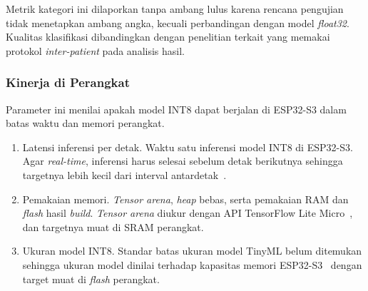 Metrik kategori ini dilaporkan tanpa ambang lulus karena rencana pengujian tidak menetapkan ambang angka, kecuali perbandingan dengan model \textit{float32}. Kualitas klasifikasi dibandingkan dengan penelitian terkait yang memakai protokol \textit{inter-patient} pada analisis hasil.

\subsubsection{Kinerja di Perangkat}

Parameter ini menilai apakah model INT8 dapat berjalan di ESP32-S3 dalam batas waktu dan memori perangkat.
\begin{enumerate}[label=\arabic*)]
  \item Latensi inferensi per detak. Waktu satu inferensi model INT8 di ESP32-S3. Agar \textit{real-time}, inferensi harus selesai sebelum detak berikutnya sehingga targetnya lebih kecil dari interval antardetak~\cite{tran_2025}.
  \item Pemakaian memori. \textit{Tensor arena}, \textit{heap} bebas, serta pemakaian RAM dan \textit{flash} hasil \textit{build}. \textit{Tensor arena} diukur dengan API TensorFlow Lite Micro~\cite{david_2021}, dan targetnya muat di SRAM perangkat.
  \item Ukuran model INT8. Standar batas ukuran model TinyML belum ditemukan sehingga ukuran model dinilai terhadap kapasitas memori ESP32-S3~\cite{espressif_esp32s3_wroom1, espressif_esp32s3_datasheet} dengan target muat di \textit{flash} perangkat.
\end{enumerate}

